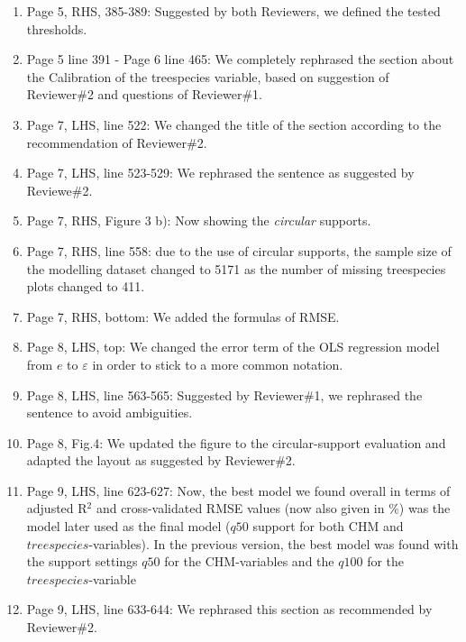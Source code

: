 \documentclass{article}
\begin{document}
\begin{enumerate}
	\item Page 5, RHS, 385-389: Suggested by both Reviewers, we defined the tested thresholds.
	
	\item Page 5 line 391 - Page 6 line 465: We completely rephrased the section about the Calibration of the treespecies variable, based on suggestion of Reviewer\#2 and questions of Reviewer\#1.
	
	\item Page 7, LHS, line 522: We changed the title of the section according to the recommendation of Reviewer\#2.
	
	\item Page 7, LHS, line 523-529: We rephrased the sentence as suggested by Reviewe\#2.
	
	\item Page 7, RHS, Figure 3 b): Now showing the \textit{circular} supports.
	
	\item Page 7, RHS, line 558: due to the use of circular supports,  the sample size of the modelling dataset changed to 5171 as the number of missing treespecies plots changed to 411. 
	
	\item Page 7, RHS, bottom: We added the formulas of RMSE.
	
	\item Page 8, LHS, top: We changed the error term of the OLS regression model from $e$ to $\varepsilon$ in order to stick to a more common notation.
	
	\item Page 8, LHS, line 563-565: Suggested by Reviewer\#1, we rephrased the sentence to avoid ambiguities.
	
	\item Page 8, Fig.4: We updated the figure to the circular-support evaluation and adapted the layout as suggested by Reviewer\#2.
	
	\item Page 9, LHS, line 623-627: Now, the best model we found overall in terms of adjusted R$^2$ and cross-validated RMSE values (now also given in \%) was the model later used as the final model ($q50$ support for both CHM and $treespecies$-variables). In the previous version, the best model was found with the support settings $q50$ for the CHM-variables and the $q100$ for the $treespecies$-variable
	
	\item Page 9, LHS, line 633-644: We rephrased this section as recommended by Reviewer\#2.
	

\end{enumerate}
\end{document}
